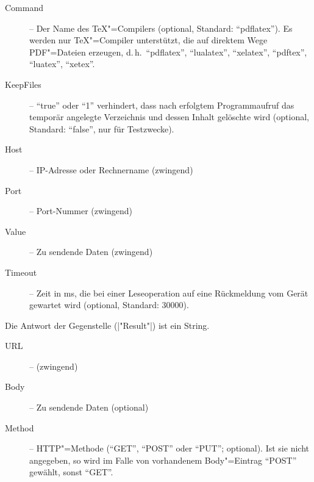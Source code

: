 \documentclass[titlepage=false,toc=nobibliography]{vl-report}
\newcommand*\action[1]{\fbox{\nolinkurl{#1}}\medskip\par}
\begin{document}
\begin{description}
\begin{description}
\begin{description}
        \item[Command] -- Der Name des \TeX"=Compilers (optional, Standard:
        "`pdflatex"'). Es werden nur \TeX"=Compiler unterstützt, die auf
        direktem Wege PDF"=Dateien erzeugen, d.\,h.\ "`pdflatex"',
        "`lualatex"', "`xelatex"', "`pdftex"', "`luatex"', "`xetex"'.

        \item[KeepFiles] -- "`true"' oder "`1"' verhindert, dass nach
        erfolgtem Programmaufruf das temporär angelegte Verzeichnis und
        dessen Inhalt gelöschte wird (optional, Standard: "`false"', nur für
        Testzwecke).

      \end{description}

    \item \action{TCP}

      \begin{description}

        \item[Host] -- IP-Adresse oder Rechnername (zwingend)

        \item[Port] -- Port-Nummer (zwingend)

        \item[Value] -- Zu sendende Daten (zwingend)

        \item[Timeout] -- Zeit in ms, die bei einer Leseoperation auf eine
        Rückmeldung vom Gerät gewartet wird (optional, Standard: 30000).

      \end{description}

      \noindent Die Antwort der Gegenstelle (|"Result"|) ist ein String.


    \item \action{HTTP}

      \begin{description}

        \item[URL] -- (zwingend)

        \item[Body] -- Zu sendende Daten (optional)

        \item[Method] -- HTTP"=Methode ("`GET"', "`POST"' oder "`PUT"';
        optional). Ist sie nicht angegeben, so wird im Falle von vorhandenem
        Body"=Eintrag "`POST"' gewählt, sonst "`GET"'.


\end{description}
\end{description}
\end{description}
\end{document}
